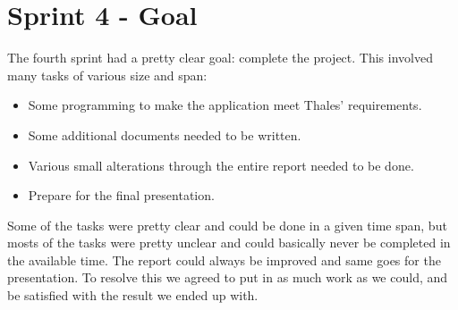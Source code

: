 \section{Sprint 4 - Goal}
The fourth sprint had a pretty clear goal: complete the project. This involved many tasks of various size and span:

\begin{itemize}
\item{}Some programming to make the application meet Thales’ requirements.
\item{}Some additional documents needed to be written.
\item{}Various small alterations through the entire report needed to be done.
\item{}Prepare for the final presentation.
\end{itemize}

Some of the tasks were pretty clear and could be done in a given time span, but mosts of the tasks were pretty unclear and could basically never be completed in the available time. The report could always be improved and same goes for the presentation. To resolve this we agreed to put in as much work as we could, and be satisfied with the result we ended up with. 